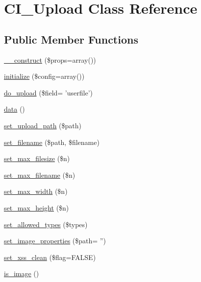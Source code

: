 \hypertarget{class_c_i___upload}{\section{C\-I\-\_\-\-Upload Class Reference}
\label{class_c_i___upload}
}
\subsection*{Public Member Functions}
\begin{DoxyCompactItemize}
\item 
\hyperlink{class_c_i___upload_a563262d396a1cef6153c9998d77bb548}{\-\_\-\-\_\-construct} (\$props=array())
\item 
\hyperlink{class_c_i___upload_a481385e36d920f5a5005ace05c6cd016}{initialize} (\$config=array())
\item 
\hyperlink{class_c_i___upload_ad4cb1d2aafb3690018dfdeb09010a48c}{do\-\_\-upload} (\$field= 'userfile')
\item 
\hyperlink{class_c_i___upload_a742e8fae78fd74219638525de1271605}{data} ()
\item 
\hyperlink{class_c_i___upload_ab2407f3a942d9b203f54e21194cf040d}{set\-\_\-upload\-\_\-path} (\$path)
\item 
\hyperlink{class_c_i___upload_a4b09b3f2b57a8bafcac1700f43d12c36}{set\-\_\-filename} (\$path, \$filename)
\item 
\hyperlink{class_c_i___upload_a1f78c3a54f32d313294b27cde4eafaf4}{set\-\_\-max\-\_\-filesize} (\$n)
\item 
\hyperlink{class_c_i___upload_aa288c7337b534788b32d66b23e25548e}{set\-\_\-max\-\_\-filename} (\$n)
\item 
\hyperlink{class_c_i___upload_a4028f187a825a666976cc3fe47cd44a8}{set\-\_\-max\-\_\-width} (\$n)
\item 
\hyperlink{class_c_i___upload_aaed82d431f5aeee6a0af294bc604a51e}{set\-\_\-max\-\_\-height} (\$n)
\item 
\hyperlink{class_c_i___upload_a7c7ddfefedddc3fd625dd816d67c21bf}{set\-\_\-allowed\-\_\-types} (\$types)
\item 
\hyperlink{class_c_i___upload_a5a85ab4c11b130ebc33ba1f07baac1fe}{set\-\_\-image\-\_\-properties} (\$path= '')
\item 
\hyperlink{class_c_i___upload_a5556024223414507d84d221862919212}{set\-\_\-xss\-\_\-clean} (\$flag=F\-A\-L\-S\-E)
\item 
\hyperlink{class_c_i___upload_af6f513bc693e3ba836f23fe9bebc6427}{is\-\_\-image} ()

\end{DoxyCompactItemize}
